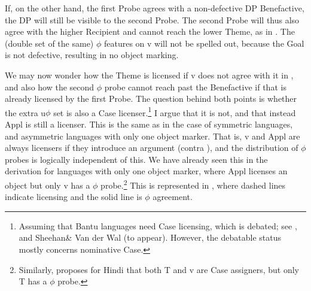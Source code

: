\documentclass[output=paper
,modfonts
,nonflat]{langsci/langscibook}
\begin{document}
If, on the other hand, the first Probe agrees with a non-defective DP Benefactive, the DP will still be visible to the second Probe. The second Probe will thus also agree with the higher Recipient and cannot reach the lower Theme, as in . The (double set of the same) $\phi$ features on v will not be spelled out, because the Goal is not defective, resulting in no object marking.
 
\begin{exe}
\end{exe} 

We may now wonder how the Theme is licensed if v does not agree with it in , and also how the second $\phi$ probe cannot reach past the Benefactive if that is already licensed by the first Probe. The question behind both points is whether the extra u$\phi$ set is also a Case licenser.\footnote{Assuming that Bantu languages need Case licensing, which is debated; see \citet{Diercks2012}, \citet{Van_der_Wal2015} and Sheehan\& Van der Wal (to appear). However, the debatable status mostly concerns nominative Case.} I argue that it is not, and that instead Appl is still a licenser. This is the same as in the case of symmetric languages, and asymmetric languages with only one object marker. That is, v and Appl are always licensers if they introduce an argument (contra \citealt{Woolford1995}), and the distribution of $\phi$ probes is logically independent of this. We have already seen this in the derivation for languages with only one object marker, where Appl licenses an object but only v has a $\phi$ probe.\footnote{Similarly, \citet{Bhatt2005} proposes for Hindi that both T and v are Case assigners, but only T has a $\phi$ probe.} This is represented in , where dashed lines indicate licensing and the solid line is $\phi$ agreement.
 
\end{document}
